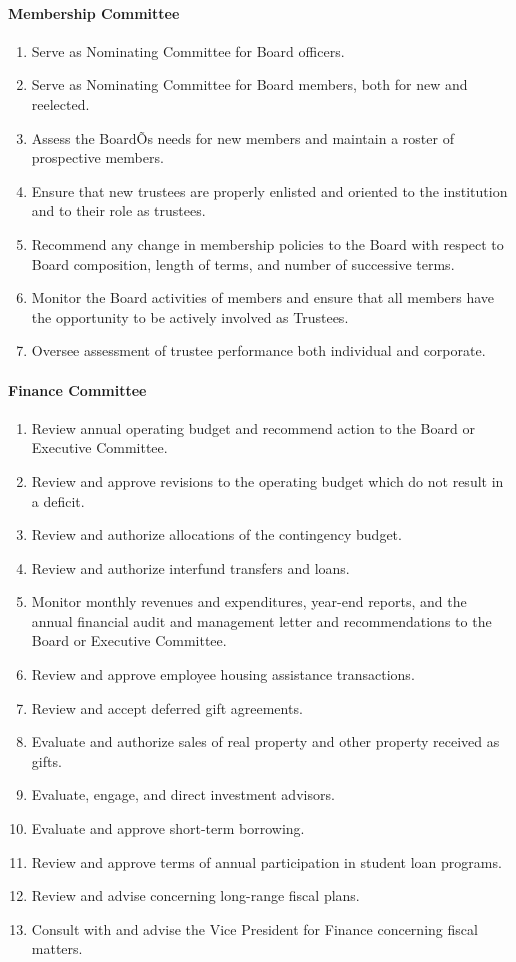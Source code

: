 \documentclass[letterpaper, 11pt]{article}
\begin{document}
			\paragraph{Membership Committee}
				\begin{enumerate}[label=\alph*)]
					\item{Serve as Nominating Committee for Board officers.}
					\item{Serve as Nominating Committee for Board members, both for new and reelected.}
					\item{Assess the BoardÕs needs for new members and maintain a roster of prospective members.}
					\item{Ensure that new trustees are properly enlisted and oriented to the institution and to their role as trustees.}
					\item{Recommend any change in membership policies to the Board with respect to Board composition, length of terms, and number of successive terms.}
					\item{Monitor the Board activities of members and ensure that all members have the opportunity to be actively involved as Trustees.}
					\item{Oversee assessment of trustee performance both individual and corporate.}
				\end{enumerate}
			\paragraph{Finance Committee}
				\begin{enumerate}[label=\alph*)]
					\item{Review annual operating budget and recommend action to the Board or Executive Committee.}
					\item{Review and approve revisions to the operating budget which do not result in a deficit.}
					\item{Review and authorize allocations of the contingency budget.}
					\item{Review and authorize interfund transfers and loans.}
					\item{Monitor monthly revenues and expenditures, year-end reports, and the annual financial audit and management letter and recommendations to the Board or Executive Committee.}
					\item{Review and approve employee housing assistance transactions.}
					\item{Review and accept deferred gift agreements.}
					\item{Evaluate and authorize sales of real property and other property received as gifts.}
					\item{Evaluate, engage, and direct investment advisors.}
					\item{Evaluate and approve short-term borrowing.}
					\item{Review and approve terms of annual participation in student loan programs.}
					\item{Review and advise concerning long-range fiscal plans.}
					\item{Consult with and advise the Vice President for Finance concerning fiscal matters.}
				\end{enumerate}
\end{document}
